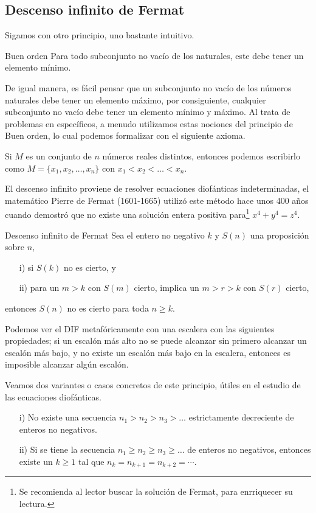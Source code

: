 \subsection{Descenso infinito de Fermat}

Sigamos con otro principio, uno bastante intuitivo.
\begin{principle.box}{Buen orden}{}
    Para todo subconjunto no vacío de los naturales, este debe tener un elemento mínimo.
\end{principle.box}
De igual manera, es fácil pensar que un subconjunto no vacío de los números naturales debe tener un elemento máximo,
por consiguiente, cualquier subconjunto no vacío debe tener un elemento mínimo y máximo.
Al trata de problemas en específicos, a menudo utilizamos estas nociones del principio de Buen orden, lo cual podemos
formalizar con el siguiente axioma.

\begin{axiom}
    Si $M$ es un conjunto de $n$ números reales distintos, entonces podemos escribirlo como $M = \{x_1,x_2,\ldots,x_n\}$
    con $x_1 < x_2 < \ldots < x_n$.
\end{axiom}

El descenso infinito proviene de resolver ecuaciones diofánticas indeterminadas, el matemático Pierre de Fermat
(1601-1665) utilizó este método hace unos 400 años cuando demostró que no existe una solución entera positiva
para\footnote{Se recomienda al lector buscar la solución de Fermat, para enrriquecer su lectura.} $x^4 + y^4 = z^4$.

\begin{principle.box}{Descenso infinito de Fermat}{}
    Sea el entero no negativo $k$ y $S(n)$ una proposición sobre $n$,
    \begin{enumerate}
        \item[i)] si $S(k)$ no es cierto, y
        \item[ii)] para un $m > k$ con $S(m)$ cierto, implica un $m > r > k$ con $S(r)$ cierto,
    \end{enumerate}
    entonces $S(n)$ no es cierto para toda $n\geq k$.
\end{principle.box}
Podemos ver el DIF metafóricamente con una escalera con las siguientes propiedades; si un escalón más alto no se puede
alcanzar sin primero alcanzar un escalón más bajo, y no existe un escalón más bajo
en la escalera, entonces es imposible alcanzar algún escalón.

Veamos dos variantes o casos concretos de este principio, útiles en el estudio de las ecuaciones diofánticas.
\begin{enumerate}
    \item[i)] No existe una secuencia $n_1 > n_2 > n_3 > \ldots$ estrictamente decreciente de enteros no negativos.
    \item[ii)] Si se tiene la secuencia $n_1\geq n_2 \geq n_3 \geq \ldots$ de enteros no negativos, entonces existe un $k \geq 1$ tal que $n_k = n_{k+1} = n_{k + 2} = \cdots$.
\end{enumerate}

